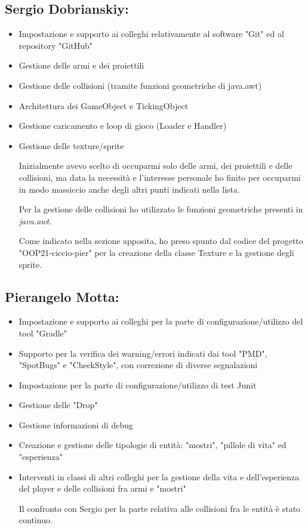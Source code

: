 \documentclass[a4paper,12pt]{report}
\begin{document}
\subsection*{Sergio Dobrianskiy:}
\begin{itemize}
	\item Impostazione e supporto ai colleghi relativamente al software "Git" ed al repository "GitHub"
	\item Gestione delle armi e dei proiettili
	\item Gestione delle collisioni (tramite funzioni geometriche di java.awt)
	\item Architettura dei GameObject e TickingObject
	\item Gestione caricamento e loop di gioco (Loader e Handler)
	\item Gestione delle texture/sprite
	
	Inizialmente avevo scelto di occuparmi solo delle armi, dei proiettili e delle collisioni, ma data la necessità e l'interesse personale ho finito per occuparmi in modo massiccio anche degli altri punti indicati nella lista. 
	
	Per la gestione delle collisioni ho utilizzato le funzioni geometriche presenti in \textit{java.awt}.
	
	Come indicato nella sezione apposita, ho preso spunto dal codice del progetto "OOP21-ciccio-pier" per la creazione della classe Texture e la gestione degli sprite.
\end{itemize}
\paragraph{}

\subsection*{Pierangelo Motta:}
\begin{itemize}
	\item Impostazione e supporto ai colleghi per la parte di configurazione/utilizzo del tool "Gradle"
	\item Supporto per la verifica dei warning/errori indicati dai tool "PMD", "SpotBugs" e "CheckStyle", con correzione di diverse segnalazioni 
	\item Impostazione per la parte di configurazione/utilizzo di test Junit
	\item Gestione delle "Drop"
	\item Gestione informazioni di debug
	\item Creazione e gestione delle tipologie di entità: "mostri", "pillole di vita" ed "esperienza"
	\item Interventi in classi di altri colleghi per la gestione della vita e dell'esperienza del player e delle collisioni fra armi e "mostri"
	
	Il confronto con Sergio per la parte relativa alle collisioni fra le entità è stato continuo.

\end{itemize}
\end{document}
